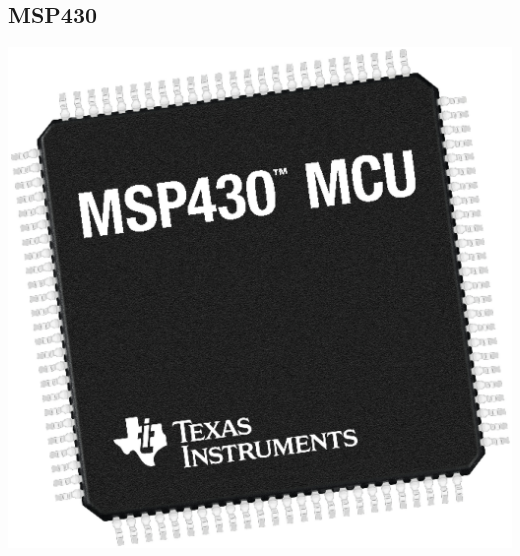 \documentclass[12pt]{article}
\begin{document}
\subsection{MSP430}
\begin{center}
  \includegraphics[scale=0.25]{images/msp430image}
\end{center}
\end{document}
